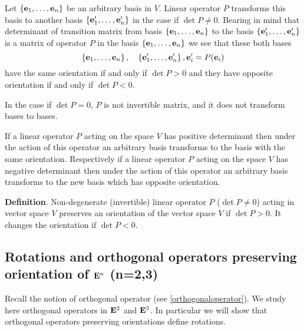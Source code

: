 \documentclass[12pt]{article}
\numberwithin{equation}{section}
\begin{document}

Let $\{{\bf e}_1,\dots,{\bf e}_n\}$ be an arbitrary basis in $V$.
Linear operator  $P$ transforms this basis to another basis
 $\{{\bf e}'_1,\dots,{\bf e}'_n\}$
in the case if $\det P\not=0$.
Bearing in mind that 
determinant of transition matrix from basis 
$\{{\bf e}_1,\dots,{\bf e}_n\}$ to the basis $\{{\bf e}'_1,\dots,{\bf e}'_n\}$
is a matrix of operator $P$ in the basis
 $\{{\bf e}_1,\dots,{\bf e}_n\}$ we see that  
these both bases
        $$
\{{\bf e}_1,\dots,{\bf e}_n\}\,,\quad 
\{{\bf e}'_1,\dots,{\bf e}'_n\}\,, {\bf e}'_i=P({\bf e}_i)
         $$
have the same orientation
if and only if $\det P>0$ and
they have opposite orientation if and only if
 $\det P<0$.

In the case if $\det P=0$, $P$ is not invertible matrix,
and it does not transform bases to bases.



If a linear operator $P$
 acting on the space $V$ has positive determinant
then under the action of this operator an  arbitrary basis
 transforms to the basis 
with the same orientation.
Respectively  if a linear operator $P$
 acting on the space $V$ has negative determinant
then under the action of this operator an  arbitrary basis
 transforms to the new basis 
which has opposite orientation.



  {\bf Definition}.
    Non-degenerate (invertible) 
linear operator $P$ ($\det P\not=0$)
    acting in vector space $V$
    preserves  an orientation of the vector space $V$
   if $\det P>0$. It changes the orientation
   if $\det P<0$.




\subsection {Rotations and orthogonal operators preserving 
orientation of ${\bf E}^n$ (n=2,3)}




     Recall the notion of orthogonal operator 
(see \ref{orthogonaloperator}).    
We study here orthogonal operators
in ${\bf E}^2$ and ${\bf E}^3$. In particular we will 
show that orthogonal operators
preserving orientations define rotations.

\end{document}
